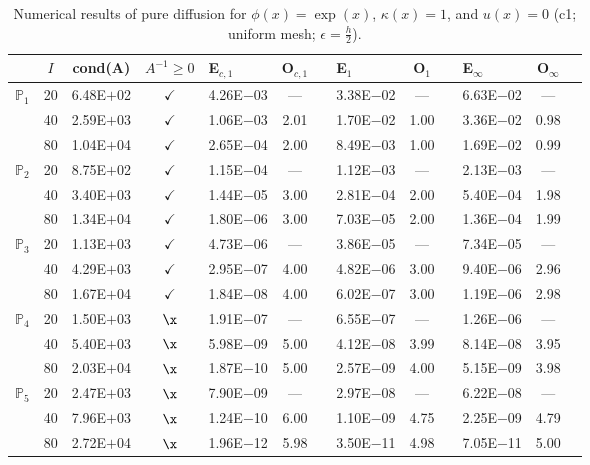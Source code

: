 \begin{table}[H]
\centering
\caption{Numerical results of pure diffusion for $\phi(x)=\exp(x)$, $\kappa(x)=1$, and $u(x)=0$ (c1; uniform mesh; $\epsilon=\frac{h}{2}$).}
\begin{tabular}{@{}l c c c l c c l c c l c c@{}}
\toprule
 & $I$ & cond(A) & $A^{-1}\geq 0$ &  E$_{c,1}$ & O$_{c,1}$ && E$_1$ & O$_1$ && E$_{\infty}$ & O$_{\infty}$\\
\midrule
\multirow{3}{*}{$\mathbb{P}_{1}$}
 & 20 & 6.48E$+$02 & $\checkmark$ & 4.26E$-$03 & --- && 3.38E$-$02 & --- && 6.63E$-$02 & ---\\
 & 40 & 2.59E$+$03 & $\checkmark$ & 1.06E$-$03 & 2.01 && 1.70E$-$02 & 1.00 && 3.36E$-$02 & 0.98\\
 & 80 & 1.04E$+$04 & $\checkmark$ & 2.65E$-$04 & 2.00 && 8.49E$-$03 & 1.00 && 1.69E$-$02 & 0.99\\
\midrule
\multirow{3}{*}{$\mathbb{P}_{2}$}
 & 20 & 8.75E$+$02 & $\checkmark$ & 1.15E$-$04 & --- && 1.12E$-$03 & --- && 2.13E$-$03 & ---\\
 & 40 & 3.40E$+$03 & $\checkmark$ & 1.44E$-$05 & 3.00 && 2.81E$-$04 & 2.00 && 5.40E$-$04 & 1.98\\
 & 80 & 1.34E$+$04 & $\checkmark$ & 1.80E$-$06 & 3.00 && 7.03E$-$05 & 2.00 && 1.36E$-$04 & 1.99\\
\midrule
\multirow{3}{*}{$\mathbb{P}_{3}$}
 & 20 & 1.13E$+$03 & $\checkmark$ & 4.73E$-$06 & --- && 3.86E$-$05 & --- && 7.34E$-$05 & ---\\
 & 40 & 4.29E$+$03 & $\checkmark$ & 2.95E$-$07 & 4.00 && 4.82E$-$06 & 3.00 && 9.40E$-$06 & 2.96\\
 & 80 & 1.67E$+$04 & $\checkmark$ & 1.84E$-$08 & 4.00 && 6.02E$-$07 & 3.00 && 1.19E$-$06 & 2.98\\
\midrule
\multirow{3}{*}{$\mathbb{P}_{4}$}
 & 20 & 1.50E$+$03 & $\x$ & 1.91E$-$07 & --- && 6.55E$-$07 & --- && 1.26E$-$06 & ---\\
 & 40 & 5.40E$+$03 & $\x$ & 5.98E$-$09 & 5.00 && 4.12E$-$08 & 3.99 && 8.14E$-$08 & 3.95\\
 & 80 & 2.03E$+$04 & $\x$ & 1.87E$-$10 & 5.00 && 2.57E$-$09 & 4.00 && 5.15E$-$09 & 3.98\\
\midrule
\multirow{3}{*}{$\mathbb{P}_{5}$}
 & 20 & 2.47E$+$03 & $\x$ & 7.90E$-$09 & --- && 2.97E$-$08 & --- && 6.22E$-$08 & ---\\
 & 40 & 7.96E$+$03 & $\x$ & 1.24E$-$10 & 6.00 && 1.10E$-$09 & 4.75 && 2.25E$-$09 & 4.79\\
 & 80 & 2.72E$+$04 & $\x$ & 1.96E$-$12 & 5.98 && 3.50E$-$11 & 4.98 && 7.05E$-$11 & 5.00\\
\bottomrule
\end{tabular}
\end{table}